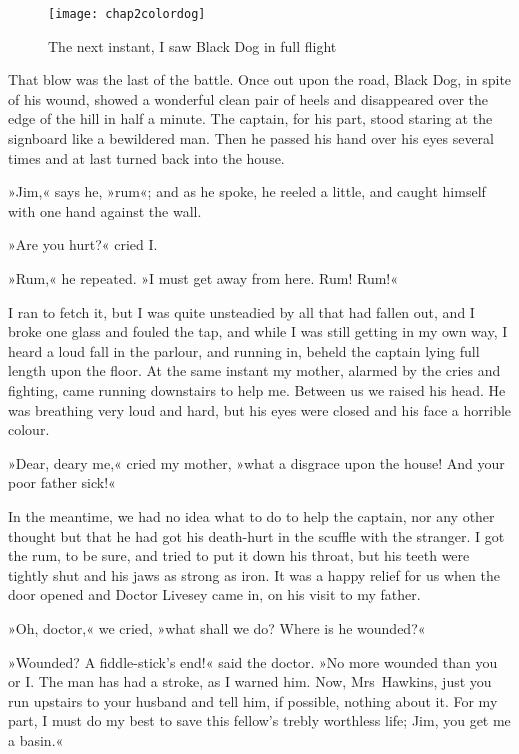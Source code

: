  \begin{figure}[p]
\centering
\texttt{[image: chap2colordog]}
\caption[\textbf{The next instant, I saw Black Dog in full flight}]{The next instant, I saw Black Dog in full flight}
\end{figure}

That blow was the last of the battle. Once out upon the road, Black Dog, in spite of his wound, showed a wonderful clean pair of heels and disappeared over the edge of the hill in half a minute. The captain, for his part, stood staring at the signboard like a bewildered man. Then he passed his hand over his eyes several times and at last turned back into the house.

»Jim,« says he, »rum«; and as he spoke, he reeled a little, and caught himself with one hand against the wall.

»Are you hurt?« cried I.

»Rum,« he repeated. »I must get away from here. Rum! Rum!«

I ran to fetch it, but I was quite unsteadied by all that had fallen out, and I broke one glass and fouled the tap, and while I was still getting in my own way, I heard a loud fall in the parlour, and running in, beheld the captain lying full length upon the floor. At the same instant my mother, alarmed by the cries and fighting, came running downstairs to help me. Between us we raised his head. He was breathing very loud and hard, but his eyes were closed and his face a horrible colour.

»Dear, deary me,« cried my mother, »what a disgrace upon the house! And your poor father sick!«

In the meantime, we had no idea what to do to help the captain, nor any other thought but that he had got his death-hurt in the scuffle with the stranger. I got the rum, to be sure, and tried to put it down his throat, but his teeth were tightly shut and his jaws as strong as iron. It was a happy relief for us when the door opened and Doctor Livesey came in, on his visit to my father.

»Oh, doctor,« we cried, »what shall we do? Where is he wounded?«

»Wounded? A fiddle-stick's end!« said the doctor. »No more wounded than you or I. The man has had a stroke, as I warned him. Now, Mrs~Hawkins, just you run upstairs to your husband and tell him, if possible, nothing about it. For my part, I must do my best to save this fellow's trebly worthless life; Jim, you get me a basin.«

